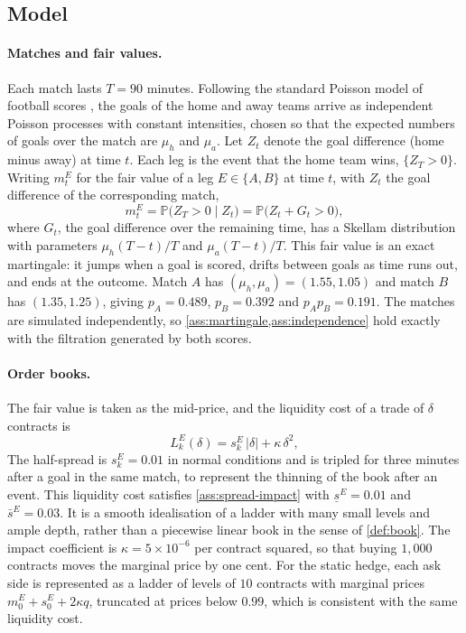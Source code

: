 \documentclass[11pt,a4paper]{article}
\theoremstyle{plain}
\theoremstyle{definition}
\theoremstyle{remark}
\newcommand{\Prob}{\mathbb{P}}
\newcommand{\1}{\mathbf{1}}
\begin{document}
\subsection{Model}

\paragraph{Matches and fair values.}
Each match lasts $T=90$ minutes. Following the standard Poisson model of football scores \cite{Maher1982}, the goals of the home and away teams arrive as independent Poisson processes with constant intensities, chosen so that the expected numbers of goals over the match are $\mu_h$ and $\mu_a$. Let $Z_t$ denote the goal difference (home minus away) at time $t$. Each leg is the event that the home team wins, $\{Z_T>0\}$. Writing $m^E_t$ for the fair value of a leg $E\in\{A,B\}$ at time $t$, with $Z_t$ the goal difference of the corresponding match,
\[
m^E_t = \Prob\bigl(Z_T>0\mid Z_t\bigr) = \Prob\bigl(Z_t + G_t > 0\bigr),
\]
where $G_t$, the goal difference over the remaining time, has a Skellam distribution \cite{Skellam1946,KarlisNtzoufras2009} with parameters $\mu_h(T-t)/T$ and $\mu_a(T-t)/T$. This fair value is an exact martingale: it jumps when a goal is scored, drifts between goals as time runs out, and ends at the outcome. Match $A$ has $(\mu_h,\mu_a) = (1.55,1.05)$ and match $B$ has $(1.35,1.25)$, giving $p_A = 0.489$, $p_B = 0.392$ and $p_Ap_B = 0.191$. The matches are simulated independently, so \cref{ass:martingale,ass:independence} hold exactly with the filtration generated by both scores.

\paragraph{Order books.}
The fair value is taken as the mid-price, and the liquidity cost of a trade of $\delta$ contracts is
\[
L^E_k(\delta) = s^E_k\,|\delta| + \kappa\,\delta^2,
\]
The half-spread is $s^E_k = 0.01$ in normal conditions and is tripled for three minutes after a goal in the same match, to represent the thinning of the book after an event. This liquidity cost satisfies \cref{ass:spread-impact} with $\underline s^E = 0.01$ and $\bar s^E = 0.03$. It is a smooth idealisation of a ladder with many small levels and ample depth, rather than a piecewise linear book in the sense of \cref{def:book}. The impact coefficient is $\kappa = 5\times 10^{-6}$ per contract squared, so that buying $1{,}000$ contracts moves the marginal price by one cent. For the static hedge, each ask side is represented as a ladder of levels of $10$ contracts with marginal prices $m^E_0 + s^E_0 + 2\kappa q$, truncated at prices below $0.99$, which is consistent with the same liquidity cost.
\end{document}
